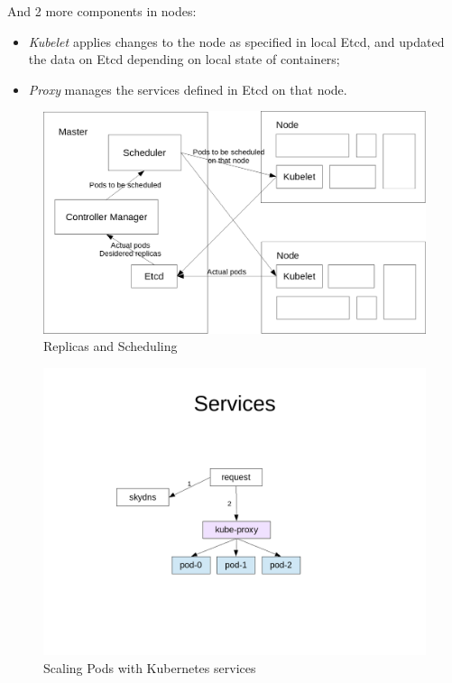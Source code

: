 And 2 more components in nodes:

\begin{itemize}
\item \textit{Kubelet} applies changes to the node as specified in local Etcd, and updated the data on Etcd depending on local state of containers;
\item \textit{Proxy} manages the services defined in Etcd on that node.
\end{itemize}

\begin{figure}[htbp]
\centering
\includegraphics{media/ch5-scheduling.png}
\caption{Replicas and Scheduling}
\end{figure}

\begin{figure}[htbp]
\centering
\includegraphics{media/ch5-services.png}
\caption{Scaling Pods with Kubernetes services}
\end{figure}

